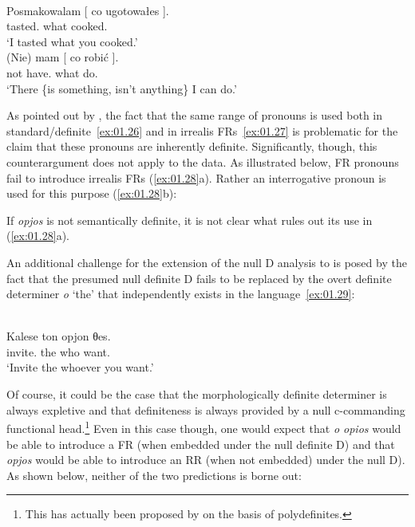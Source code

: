 \documentclass[output=paper]{langsci/langscibook}
\begin{document}
\ea {} \citep[27]{Caponigro2003}\label{ex:01.26}\\%
	\gll Posmakowalam [ co ugotowałes ].\\
            tasted.\Fsg{} {} what cooked.\Ssg{}\\
	\glt    \enquote*{I tasted what you cooked.}
\ex {} \citep[88]{Caponigro2003}\label{ex:01.27}\\%
    \gll (Nie) mam [ co robić ].\\
            \hphantom{(}not have.\Fsg{} {} what do.\Inf{}\\
	\glt    \enquote*{There \{is something, isn’t anything\} I can do.}
\z

As pointed out by \citet{Caponigro2003}, the fact that the same range of
pronouns is used both in standard/definite~\eqref{ex:01.26} and in irrealis
\glspl{FR}~\eqref{ex:01.27} is problematic for the claim that these
pronouns are inherently definite.  Significantly, though, this counterargument
does not apply to the  data.  As illustrated below, \gls{FR}
pronouns fail to introduce irrealis \glspl{FR} (\ref{ex:01.28}a).  Rather
an interrogative pronoun is used  for this purpose (\ref{ex:01.28}b):

\ea {}\label{ex:01.28}
	\z
\z

\noindent If \emph{opjos} is not semantically definite, it is not clear what rules out
its use in (\ref{ex:01.28}a).

An additional challenge for the extension of the null D analysis to  is
posed by the fact that the presumed null definite D fails to be replaced by the
overt definite determiner \emph{o} ‘the’ that independently exists in the
language~\eqref{ex:01.29}:

\ea {}\label{ex:01.29}\\
    \gll \llap{*}Kalese ton opjon θes.\\
    invite.\Ssg{} the who want.\Ssg{}\\
    \trans *\enquote*{Invite the whoever you want.}
\z

Of course, it could be the case that the morphologically definite determiner is
always expletive and that definiteness is always provided by a null
c-com\-mand\-ing functional head.\footnote{ This has actually been proposed by
\textcite{LekSze2012} on the basis of polydefinites.} Even in this case
though, one would expect that \emph{o opios} would be able to introduce a
\gls{FR} (when embedded under the null definite D) and that \emph{opjos}
would be able to introduce an \gls{RR} (when not embedded) under the null D).
As shown below, neither of the two predictions is borne out:
\end{document}
